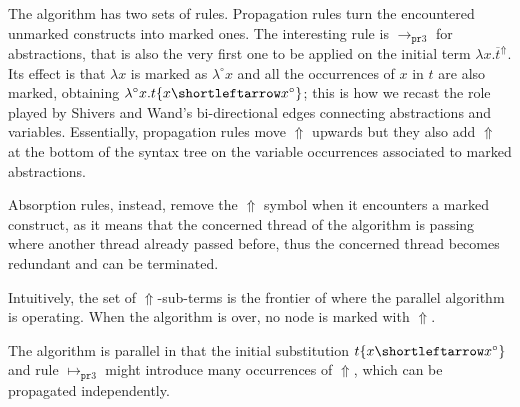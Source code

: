 \documentclass[10pt,a4paper]{article}
\theoremstyle{remark}
\newcommand{\la}[1]{\lambda #1.}
\newcommand{\tm}{t}
\newcommand{\var}{x}
\newcommand{\rootRew}[1]{\mapsto_{#1}}
\newcommand{\Rew}[1]{\rightarrow_{#1}}
\newcommand{\symfont}[1]{\mathtt{#1}}
\newcommand{\isub}[2]{\{#1{\shortleftarrow}#2\}}
\renewcommand{\l}{\lambda}
\newcommand{\taken}{\circ}
\newcommand{\lat}[1]{\l^\taken{#1}.}
\newcommand{\frontiersym}{\Uparrow}
\newcommand{\skelu}[1]{\overline{#1}^{\frontiersym}}
\newcommand{\rtomarkblthree}{\rootRew{\prsym3}}
\newcommand{\tomarkblthree}{\Rew{\prsym3}}
\newcommand{\prsym}{\symfont{pr}}
\begin{document}
The algorithm has two sets of rules. Propagation rules turn the encountered unmarked constructs into marked ones. The interesting rule is $\tomarkblthree$ for abstractions, that is also the very first one to be applied on the initial term $\la\var\skelu\tm$. Its effect is that $\lambda\var$ is marked as $\l^\taken\var$ and all the occurrences of $\var$ in $\tm$ are also marked, obtaining $\lat\var\tm\isub\var{\var^\taken}$; this is how we recast the role played by Shivers and Wand's bi-directional edges connecting abstractions and variables. Essentially, propagation rules move $\frontiersym$ upwards but they also add $\frontiersym$ at the bottom of the syntax tree on the variable occurrences associated to marked abstractions.

Absorption rules, instead, remove the $\frontiersym$ symbol when it encounters a marked construct, as it means that the concerned thread of the algorithm is passing where another thread already passed before, thus the concerned thread becomes redundant and can be terminated. 

Intuitively, the set of $\frontiersym$-sub-terms is the frontier of where the parallel algorithm is operating. When the algorithm is over, no node is marked with $\frontiersym$. 

The algorithm is parallel in that the initial substitution $\tm\isub\var{\var^\taken}$ and rule $\rtomarkblthree$ might introduce many occurrences of $\frontiersym$, which can be propagated independently.

\end{document}
